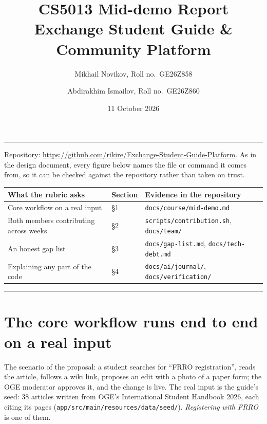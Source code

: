 \documentclass[11pt]{article}
\title{\vspace{-2em}CS5013 Mid-demo Report\\[0.3em]
\large Exchange Student Guide \& Community Platform}
\author{Mikhail Novikov, Roll no.\ GE26Z858 \and Abdirakhim Ismailov, Roll no.\ GE26Z860}
\date{11 October 2026}
\begin{document}
\sloppy
\maketitle

\vspace{-1em}
\noindent\rule{\textwidth}{0.4pt}

\noindent Repository: \url{https://github.com/rikire/Exchange-Student-Guide-Platform}. As in the
design document, every figure below names the file or command it comes from, so it can be checked
against the repository rather than taken on trust.

\vspace{0.4em}
\noindent\begin{tabularx}{\textwidth}{@{}llX@{}}
\toprule
\textbf{What the rubric asks} & \textbf{Section} & \textbf{Evidence in the repository} \\
\midrule
Core workflow on a real input & \S1 & \texttt{docs/course/mid-demo.md} \\
Both members contributing across weeks & \S2 & \texttt{scripts/contribution.sh}, \texttt{docs/team/} \\
An honest gap list & \S3 & \texttt{docs/gap-list.md}, \texttt{docs/tech-debt.md} \\
Explaining any part of the code & \S4 & \texttt{docs/ai/journal/}, \texttt{docs/verification/} \\
\bottomrule
\end{tabularx}

\noindent\rule{\textwidth}{0.4pt}

\section{The core workflow runs end to end on a real input}

The scenario of the proposal: a student searches for ``FRRO registration'', reads the article,
follows a wiki link, proposes an edit with a photo of a paper form; the OGE moderator approves it,
and the change is live. The real input is the guide's seed: 38 articles written from OGE's
International Student Handbook 2026, each citing its pages (\texttt{app/src/main/resources/data/seed/}).
\emph{Registering with FRRO} is one of them.
\end{document}
